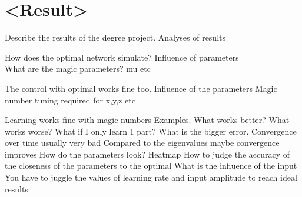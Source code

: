 \chapter{<Result>}
Describe the results of the degree project.
Analyses of results

How does the optimal network simulate?
Influence of parameters\\
What are the magic parameters? mu etc



The control with optimal works fine too.
Influence of the parameters
Magic number tuning required for x,y,z etc

Learning works fine with magic numbers
Examples.
What works better?
What works worse?
What if I only learn 1 part? What is the bigger error.
Convergence over time usually very bad
Compared to the eigenvalues maybe convergence improves
How do the parameters look? Heatmap
How to judge the accuracy of the closeness of the parameters to the optimal
What is the influence of the input
You have to juggle the values of learning rate and input amplitude to reach ideal results





